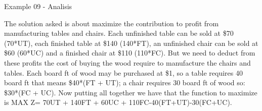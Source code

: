 \begin{frame}{Example 09 - Analisis}

The solution asked is about maximize the contribution to profit from manufacturing
tables and chairs. Each unfinished table can be sold at \$70 (70*UT), each finished
table at \$140 (140*FT), an unfinished chair can be sold at \$60 (60*UC) and a finished
chair at \$110 (110*FC). But we need to deduct from these profits the cost of buying
the wood require to manufacture the chairs and tables. Each board ft of wood may be
purchased at \$1, so a table requires 40 board ft that means \$40*(FT + UT); a chair requires
30 board ft of wood so: \$30*(FC + UC). Now putting all together we have that the function
to maximize is MAX Z= 70UT + 140FT + 60UC + 110FC-40(FT+UT)-30(FC+UC).

\end{frame}
